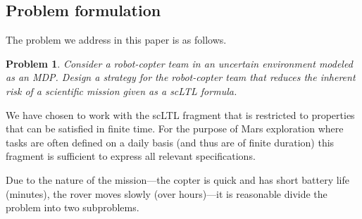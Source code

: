 \documentclass[conference]{IEEEtran}
\newtheorem{problem}{Problem}
\begin{document}

\subsection{Problem formulation}

The problem we address in this paper is as follows.

\begin{problem}
\label{prob:basic}
Consider a robot-copter team in an uncertain environment modeled as an MDP.  Design a strategy for the robot-copter team that reduces the inherent risk of a scientific mission given as a scLTL formula.
\end{problem}

We have chosen to work with the scLTL fragment that is restricted to properties that can be satisfied in finite time. For the purpose of Mars exploration where tasks are often defined on a daily basis (and thus are of finite duration) this fragment is sufficient to express all relevant specifications.


Due to the nature of the mission---the copter is quick and has short battery life (minutes), the rover moves slowly (over hours)---it is reasonable divide the problem into two subproblems.
  
\end{document}
